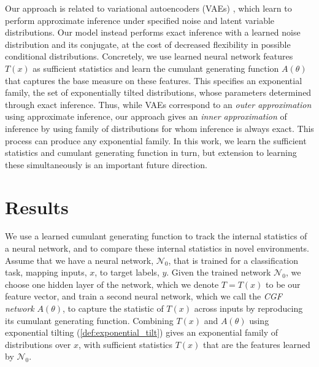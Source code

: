 \documentclass{article}      %
\begin{document}
Our approach is related to variational autoencoders (VAEs) \cite{kingma_auto-encoding_2013}, which learn to perform approximate inference under specified noise and latent variable distributions. 
Our model instead performs exact inference with a learned noise distribution and its conjugate, at the cost of decreased flexibility in possible conditional distributions.
Concretely, we use learned neural network features $T(x)$ as sufficient statistics and learn the cumulant generating function $A(\theta)$ that captures the base measure on these features.
This specifies an exponential family, the set of exponentially tilted distributions, whose parameters determined through exact inference.
Thus, while VAEs correspond to an \textit{outer approximation} using approximate inference, our approach gives an \textit{inner approximation} of inference by using family of distributions for whom inference is always exact.
This process can produce any exponential family.
In this work, we learn the sufficient statistics and cumulant generating function in turn, but extension to learning these simultaneously is an important future direction.





\section{Results}

We use a learned cumulant generating function to track the internal statistics of a neural network, and to compare these internal statistics in novel environments.
Assume that we have a neural network, $\mathcal{N}_0$, that is trained for a classification task, mapping inputs, $x$, to target labels, $y$.
Given the trained network $\mathcal{N}_0$, we choose one hidden layer of the network, which we denote $T=T(x)$ to be our feature vector, and train a second neural network, which we call the \textit{CGF network} $A(\theta)$, to capture the statistic of $T(x)$ across inputs by reproducing its cumulant generating function. 
Combining $T(x)$ and $A(\theta)$ using exponential tilting (\ref{def:exponential_tilt}) gives an exponential family of distributions over $x$, with sufficient statistics $T(x)$ that are the features learned by $\mathcal{N}_0$.
\end{document}
